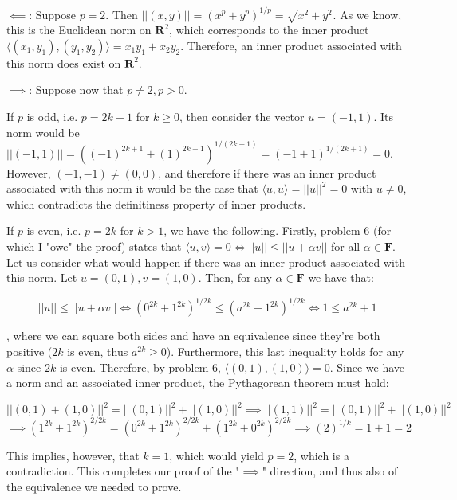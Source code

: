 \begin{solution}

$\impliedby$: Suppose $p=2$. Then $\lvert \lvert (x, y) \rvert \rvert = (x^p + y^p)^{1/p} = \sqrt{x^2 + y^2}$. As we know, this is the Euclidean norm on $\mathbf{R}^2$, which corresponds to the inner product $\langle (x_1, y_1), (y_1, y_2) \rangle = x_1 y_1 + x_2 y_2$. Therefore, an inner product associated with this norm does exist on $\mathbf{R}^2$.

$\implies$: Suppose now that $p \neq 2, p > 0$. 

If $p$ is odd, i.e. $p = 2k + 1$ for $k \geq 0$, then consider the vector $u = (-1, 1)$. Its norm would be $\lvert \lvert (-1, 1) \rvert \rvert = ((-1)^{2k + 1} + (1)^{2k+1})^{1/(2k+1)} = (-1 + 1)^{1/(2k+1)} = 0$. However, $(-1, -1) \neq (0,0)$, and therefore if there was an inner product associated with this norm it would be the case that $\langle u, u \rangle = \lvert \lvert u \rvert \rvert^{2} = 0$ with $u \neq 0$, which contradicts the definitiness property of inner products.

If $p$ is even, i.e. $p = 2k$ for $k > 1$, we have the following. Firstly, problem 6 (for which I "owe" the proof) states that $\langle u, v \rangle = 0 \iff \lvert \lvert u \rvert \rvert \leq \lvert \lvert u + \alpha v \rvert \rvert $ for all $\alpha \in \mathbf{F}$. Let us consider what would happen if there was an inner product associated with this norm. Let $u = (0, 1), v = (1, 0)$. Then, for any $\alpha \in \mathbf{F}$ we have that:

$$\lvert \lvert u \rvert \rvert \leq \lvert \lvert u + \alpha v \rvert \rvert \iff (0^{2k} + 1^{2k})^{1/2k} \leq (a^{2k} + 1^{2k})^{1/2k} \iff 1 \leq a^{2k} + 1 $$

, where we can square both sides and have an equivalence since they're both positive ($2k$ is even, thus $a^{2k} \geq 0$). Furthermore, this last inequality holds for any $\alpha$ since $2k$ is even. Therefore, by problem 6, $\langle (0, 1), (1, 0) \rangle = 0$. Since we have a norm and an associated inner product, the Pythagorean theorem must hold:

$$\lvert \lvert (0, 1) + (1, 0) \rvert \rvert^2 = \lvert \lvert (0, 1) \rvert \rvert^2 + \lvert \lvert (1, 0) \rvert \rvert^2 \implies \lvert \lvert (1, 1) \rvert \rvert^2 = \lvert \lvert (0, 1) \rvert \rvert^2 + \lvert \lvert (1, 0) \rvert \rvert^2 $$
$$\implies (1^{2k} + 1^{2k})^{2/2k} = (0^{2k} + 1^{2k})^{2/2k} + (1^{2k} + 0^{2k})^{2/2k} \implies (2)^{1/k} = 1 + 1 = 2$$

This implies, however, that $k = 1$, which would yield $p = 2$, which is a contradiction. This completes our proof of the "$\implies$" direction, and thus also of the equivalence we needed to prove.

\end{solution}

